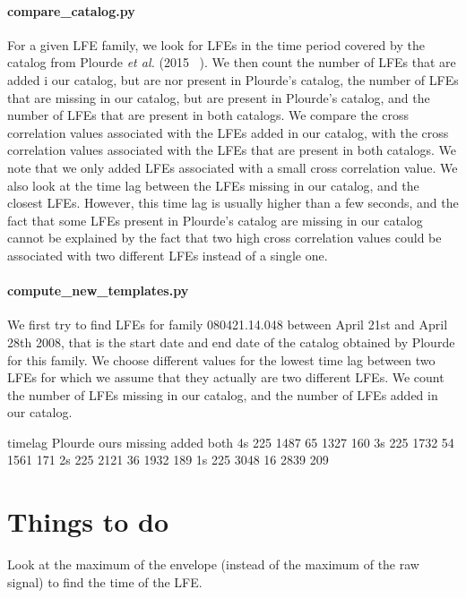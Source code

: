 \documentclass[workdone.tex]{subfiles}
\begin{document}
\paragraph{compare\_catalog.py} For a given LFE family, we look for LFEs in the time period covered by the catalog from Plourde \textit{et al.} (2015 ~\cite{PLO_2015}). We then count the number of LFEs that are added i our catalog, but are nor present in Plourde's catalog, the number of LFEs that are missing in our catalog, but are present in Plourde's catalog, and the number of LFEs that are present in both catalogs. We compare the cross correlation values associated with the LFEs added in our catalog, with the cross correlation values associated with the LFEs that are present in both catalogs. We note that we only added LFEs associated with a small cross correlation value. We also look at the time lag between the LFEs missing in our catalog, and the closest LFEs. However, this time lag is usually higher than a few seconds, and the fact that some LFEs present in Plourde's catalog are missing in our catalog cannot be explained by the fact that two high cross correlation values could be associated with two different LFEs instead of a single one.

\paragraph{compute\_new\_templates.py}

We first try to find LFEs for family 080421.14.048 between April 21st and April 28th 2008, that is the start date and end date of the catalog obtained by Plourde for this family. We choose different values for the lowest time lag between two LFEs for which we assume that they actually are two different LFEs. We count the number of LFEs missing in our catalog, and the number of LFEs added in our catalog.

timelag Plourde ours missing added both
4s 225 1487 65 1327 160
3s 225 1732 54 1561 171
2s 225 2121 36 1932 189
1s 225 3048 16 2839 209

\section{Things to do}

Look at the maximum of the envelope (instead of the maximum of the raw signal) to find the time of the LFE.
\end{document}
